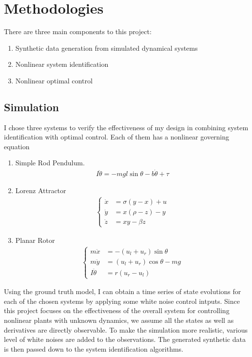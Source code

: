 \documentclass[10pt,twocolumn]{article}
\begin{document}
\section{Methodologies}

There are three main components to this project:
\begin{enumerate}
  \item Synthetic data generation from simulated dynamical systems
  \item Nonlinear system identification
  \item Nonlinear optimal control
\end{enumerate}

\subsection{Simulation}\label{sec:sim}

I chose three systems to verify the effectiveness of my design in combining
system identification with optimal control. Each of them has a nonlinear governing equation
\begin{enumerate}
  \item Simple Rod Pendulum.
    \begin{gather}\label{eqa:pendulum}
      I \ddot{\theta} = -mgl \sin{\theta} - b\dot{\theta} + \tau
    \end{gather}

  \item Lorenz Attractor
    \begin{gather}\label{eqa:lorenz}
      \left\{\begin{aligned}
        \dot{x} &= \sigma (y - x) + u \\
        \dot{y} &=x (\rho - z) - y \\
        \dot{z} &=xy - \beta z
      \end{aligned}\right.
    \end{gather}

  \item Planar Rotor
    \begin{gather}
      \left\{\begin{aligned}
        m\ddot{x} &= -(u_l + u_r) \sin{\theta} \\
        m\ddot{y} &= (u_l + u_r) \cos{\theta} - mg \\
        I\ddot{\theta} &= r(u_r - u_l)
      \end{aligned}\right.
    \end{gather}
\end{enumerate}
Using the ground truth model, I can obtain a time series of state evolutions for
each of the chosen systems by applying some white noise control intputs. Since
this project focuses on the effectiveness of the overall system for controlling
nonlinear plants with unknown dynamics, we assume all the states as well as derivatives
are directly observable. To make the simulation more realistic, various level of white noises
are added to the observations. The generated synthetic data is then passed down to
the system identification algorithms.
\end{document}
